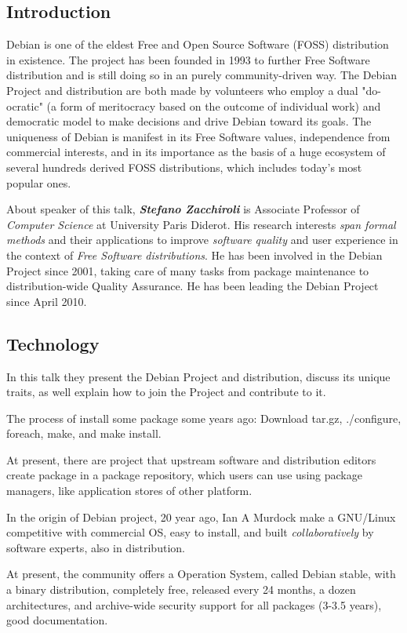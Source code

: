 \documentclass[11pt]{article}
\begin{document}
\subsection{Introduction}
Debian is one of the eldest Free and Open Source Software (FOSS) distribution in existence. The project has been founded in 1993 to further Free Software distribution and is still doing so in an purely community-driven way. The Debian Project and distribution are both made by volunteers who employ a dual "do-ocratic" (a form of meritocracy based on the outcome of individual work) and democratic model to make decisions and drive Debian toward its goals. The uniqueness of Debian is manifest in its Free Software values, independence from commercial interests, and in its importance as the basis of a huge ecosystem of several hundreds derived FOSS distributions, which includes today's most popular ones. 

About speaker of this talk, \emph{\textbf{Stefano Zacchiroli}} is Associate Professor of \emph{Computer Science} at University Paris Diderot. His research interests \emph{span formal methods} and their applications to improve \emph{software quality} and user experience in the context of \emph{Free Software distributions}. He has been involved in the Debian Project since 2001, taking care of many tasks from package maintenance to distribution-wide Quality Assurance. He has been leading the Debian Project since April 2010.

\subsection{Technology}
In this talk they present the Debian Project and distribution, discuss its unique traits, as well explain how to join the Project and contribute to it.

The process of install some package some years ago: Download tar.gz, ./configure, foreach, make, and make install.

At present, there are project that upstream software and distribution editors create package in a package repository, which users can use using package managers, like application stores of other platform.

In the origin of Debian project, 20 year ago, Ian A Murdock make a GNU/Linux competitive with commercial OS, easy to install, and built \emph{collaboratively} by software experts, also in distribution.

At present, the community offers a Operation System, called Debian stable, with a binary distribution, completely free, released every 24 months, a dozen architectures, and archive-wide security support for all packages (3-3.5 years), good documentation.
\end{document}
